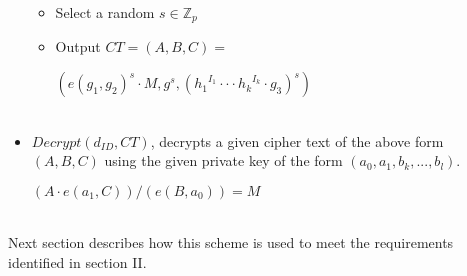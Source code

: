 \begin{itemize}
\begin{itemize}
	\item Select a random $s \in \mathbb{Z}_p$ 
	\item Output $CT =(A, B, C) = $  
	\begin{center}
	$(e(g_1, g_2)^s \cdot M,  g^s,  {({{h_1}^{I_1}\cdot \cdot \cdot {h_k}^{I_k}} \cdot {g_3} )}^s)$\\\
	\end{center}
\end{itemize}	


\item $Decrypt (d_{ID}, CT)$, decrypts a given cipher text of the above form $(A, B, C)$ using the given private key of the form $(a_0, a_1, b_k, ... , b_l)$. \\
	\begin{center}
$(A \cdot e(a_1, C))/(e(B, a_0)) = M$\\\
	\end{center}
\end{itemize}

Next section describes how this scheme is used to meet the requirements identified in section II.
